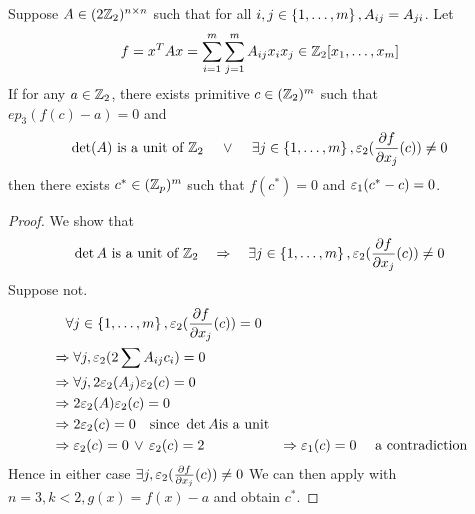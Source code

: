 \begin{cor}
    Suppose $A \in (2 \mathbb{Z}_2)^{n \times n}$
    such that for all 
    $i,j \in \left\{1,\dots,m\right\}, A_{ij} = A_{ji}$. 
    Let
    \[
        f = x^T A x = 
        \sum_{i = 1}^m \sum_{j = 1}^m A_{ij} x_i x_j
        \in \mathbb{Z}_2[x_1,\dots,x_m]
    \]
    If for any $a \in \mathbb{Z}_2$,
    there exists primitive $c \in (\mathbb{Z}_2)^m$
    such that $ep_3(f(c) - a) = 0$ and
    \[\det(A) \text{ is a unit of } \mathbb{Z}_2 \quad \, \lor \, \quad 
    \exists j \in \left\{1,\dots,m\right\}, \varepsilon_2(\frac{\partial f}{\partial x_j}(c)) \ne 0\]
    then there exists $c^* \in (\mathbb{Z}_p)^m$
    such that $f(c^*) = 0$ and $\varepsilon_1(c^* - c) = 0$.   
\end{cor}
\begin{proof}
    We show that 
    \[\det A \text{ is a unit of } \mathbb{Z}_2 \quad \Rightarrow \quad 
    \exists j \in \left\{1,\dots,m\right\}, \varepsilon_2(\frac{\partial f}{\partial x_j}(c)) \ne 0\]
    Suppose not.
    \begin{align*}
        &\quad \forall j \in \left\{1,\dots,m\right\}, \varepsilon_2(\frac{\partial f}{\partial x_j}(c)) = 0\\
        &\Rightarrow \forall j, \varepsilon_2(2 \sum A_{ij} c_i) = 0\\
        &\Rightarrow \forall j, 2 \varepsilon_2(A_j)\varepsilon_2(c) = 0\\
        &\Rightarrow 2 \varepsilon_2(A)\varepsilon_2(c) = 0\\
        &\Rightarrow 2 \varepsilon_2(c) = 0 \quad \text{since } 
        \det A \text{is a unit}\\
        &\Rightarrow \varepsilon_2(c) = 0 \, \lor \, \varepsilon_2(c) = 2
        &\Rightarrow \varepsilon_1(c) = 0 \quad \text{ a contradiction}
    \end{align*}
    Hence in either case $\exists j, \varepsilon_2(\frac{\partial f}{\partial x_j}(c)) \ne 0$
    We can then apply  
    with $n = 3, k < 2, g(x) = f(x) - a$ and obtain $c^*$.
\end{proof}



